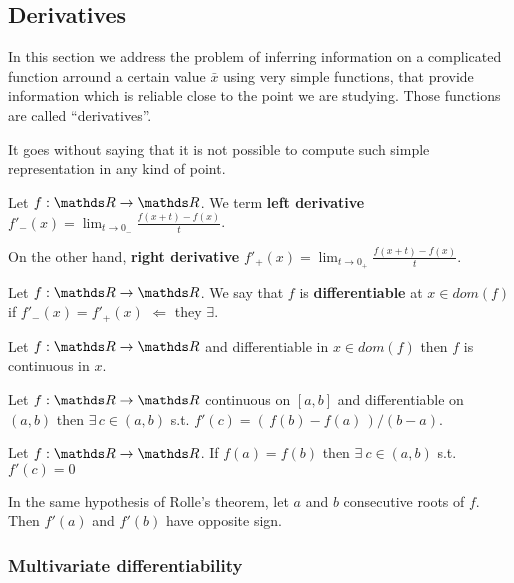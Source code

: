 \documentclass[ComputationalMathematics.tex]{subfiles}
\begin{document}
\subsection{Derivatives}

In this section we address the problem of inferring information on a complicated function arround a certain value $\bar{x}$ using very simple functions, that provide information which is reliable close to the point we are studying.
Those functions are called ``derivatives''.

It goes without saying that it is not possible to compute such simple representation in any kind of point.

\begin{definition}
  Let $f: \R \to \R$. We term \textbf{left derivative} $f'_{-}(x) = \lim_{t \to 0_{-}} \frac{f(x + t) - f(x)}{t}$.
  
  On the other hand, \textbf{right derivative} $f'_{+}(x) = \lim_{t \to 0_{+}} \frac{f(x + t) - f(x)}{t}$.
\end{definition}

\begin{definition}[Differentiable]
  Let $f:\R \to \R$. We say that $f$ is \textbf{differentiable} at $x \in dom(f)$ if $f'_-(x) = f'_+(x)$ $\Leftarrow$ they $\exists$.
\end{definition}

\begin{proposition}
  Let $f: \R \to \R$ and differentiable in $x \in dom(f)$ then $f$ is continuous in $x$. 
\end{proposition}


\begin{theorem}
Let $f : \R \to \R$ continuous on $[a, b]$ and differentiable on $(a,b)$ then $\exists \, c \in (a, b)$ s.t. $f'(c) = ( \, f(b) - f(a) \, ) / (b - a)$.
\end{theorem}

\begin{theorem}
Let $f: \R \to \R$. If $f(a) = f(b)$ then $\exists~c \in (a, b)$ s.t.~$f'(c) = 0$
\end{theorem}

\begin{corollary}
In the same hypothesis of Rolle's theorem, let $a$ and $b$ consecutive roots of $f$. Then $f'(a)$ and $f'(b)$ have opposite sign.
\end{corollary}

\subsubsection{Multivariate differentiability}
\end{document}
